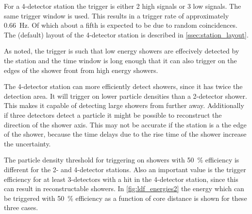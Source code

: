 For a 4-detector station the trigger is either 2 high signals or 3 low signals. The same trigger window is used. This results in a trigger rate of approximately \SI{0.66}{\hertz}. Of which about a fifth is expected to be due to random coincidences. The (default) layout of the 4-detector station is described in \cref{ssec:station_layout}.

As noted, the trigger is such that low energy showers are effecively detected by the station and the time window is long enough that it can also trigger on the edges of the shower front from high energy showers.

The 4-detector station can more efficiently detect showers, since it has twice the detection area. It will trigger on lower particle densities than a 2-detector shower. This makes it capable of detecting large showers from further away. Additionally if three detectors detect a particle it might be possible to reconstruct the direction of the shower axis. This may not be accurate if the station is a the edge of the shower, because the time delays due to the rise time of the shower increase the uncertainty.

The particle density threshold for triggering on showers with \SI{50}{\percent} efficiency is different for the 2- and 4-detector stations. Also an important value is the trigger efficiency for at least 3-detectors with a hit in the 4-detector station, since this can result in reconstructable showers. In \cref{fig:ldf_energies2} the energy which can be triggered with \SI{50}{\percent} efficiency as a function of core distance is shown for these three cases.

